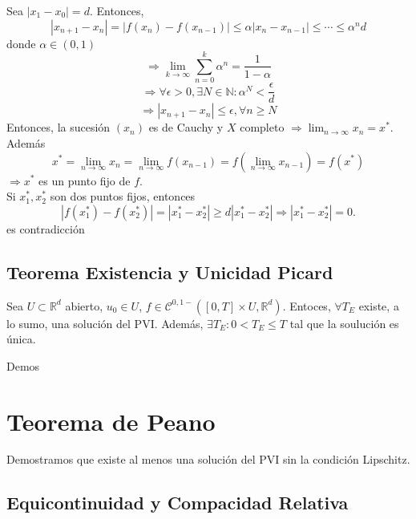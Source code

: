 \begin{dem}
  Sea $| x_{1} - x_{0} | = d$. Entonces, 
  \[ 
    | x_{n+1} - x_{n} | = | f(x_{n}) - f(x_{n-1}) | \leq \alpha | x_{n} - x_{n-1} |\leq \cdots \leq \alpha^n d
  \] 
  donde $\alpha \in (0,1)$ 
  \[
    \Rightarrow \lim_{k \to \infty}\sum_{n=0}^{k} \alpha^n = \frac{1}{1 - \alpha}
  \]
  \[
    \Rightarrow \forall \epsilon > 0, \exists N \in \mathbb{N}: \alpha^N < \frac{\epsilon}{d}
  \]
  \[ 
    \Rightarrow | x_{n+1} - x_{n} | \leq \epsilon, \forall n \geq N
  \] 
  Entonces, la sucesión $(x_{n})$ es de Cauchy y $X$ completo $\Rightarrow \lim_{n \to \infty} x_{n} = x^*$. Además
  \[ 
    x^* = \lim_{n \to \infty} x_{n} = \lim_{n \to \infty} f(x_{n-1}) = f( \lim_{n \to \infty} x_{n-1}) = f(x^*)
  \] 
  $\Rightarrow x^*$ es un punto fijo de $f$. \\

  Si $x_{1}^*, x_{2}^*$ son dos puntos fijos, entonces
  \[ 
    | f(x_{1}^*) - f(x_{2}^*) | = | x_{1}^* - x_{2}^* | \geq d | x_{1}^* - x_{2}^* | \Rightarrow | x_{1}^* - x_{2}^* | = 0.
  \] 
  es contradicción
\end{dem}

\subsection{Teorema Existencia y Unicidad Picard}

\begin{theo}
  Sea $U \subset \mathbb{R}^{d}$ abierto, $u_{0} \in U$, $f \in \mathcal{C}^{0,1-}([0, T] \times U, \mathbb{R}^{d})$. Entoces, $\forall T_{E}$ existe, a lo sumo, una solución del PVI. Además, $\exists T_{E}: 0 < T_{E} \leq T$ tal que la soulución es única.
\end{theo}

\begin{dem}
  Demos
\end{dem}

\section{Teorema de Peano}

\begin{note}
  Demostramos que existe al menos una solución del PVI sin la condición Lipschitz.
\end{note}

\subsection{Equicontinuidad y Compacidad Relativa}


